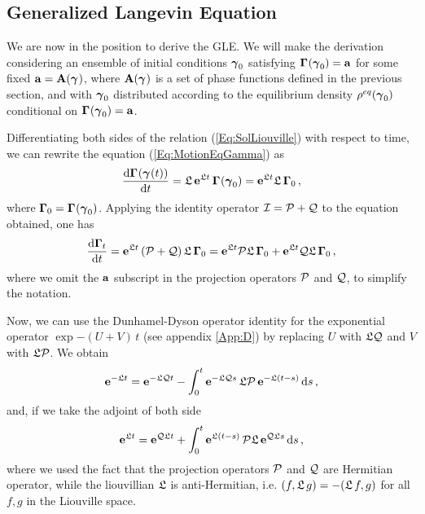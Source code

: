 \documentclass[10pt,a4paper]{book}
\theoremstyle{definition}
\begin{document}
\subsection{Generalized Langevin Equation}
We are now in the position to derive the GLE. We will make the derivation considering an ensemble of initial conditions $\boldsymbol\gamma_{0}$ satisfying $\boldsymbol\Gamma_{}(\boldsymbol\gamma_{0})=\mathbf{a}$ for some fixed $\mathbf{a}=\mathbf{A}(\boldsymbol\gamma_{})$, where $\mathbf{A}(\boldsymbol\gamma_{})$ is a set of phase functions defined in the previous section, and with $\boldsymbol\gamma_{0}$ distributed according to the equilibrium density $\rho^{eq}(\boldsymbol\gamma_{0})$ conditional on $\boldsymbol\Gamma_{}(\boldsymbol\gamma_{0})=\mathbf{a}$.  

Differentiating both sides of the relation (\ref{Eq:SolLiouville}) with respect to time, we can rewrite the equation (\ref{Eq:MotionEqGamma}) as
\begin{equation}
 \frac{\mbox{d}\boldsymbol\Gamma_{}(\boldsymbol\gamma_{}(t))}{\mbox{d}t} = \mathfrak{L}\,\mathbf{e}^{\mathfrak{L} t}\,\boldsymbol\Gamma_{}(\boldsymbol\gamma_{0}) = \mathbf{e}^{\mathfrak{L} t}\mathfrak{L}\,\boldsymbol\Gamma_{0}\,, 
\end{equation}
where $\boldsymbol\Gamma_{0}=\boldsymbol\Gamma_{}(\boldsymbol\gamma_{0})$. Applying the identity operator $\mathcal{I}=\mathcal{P}+\mathcal{Q}$ to the equation obtained, one has
\begin{equation}\label{Eq:MoIdProj}
 \frac{\mbox{d}\boldsymbol\Gamma_{t}}{\mbox{d}t} = \mathbf{e}^{\mathfrak{L} t}\left(\mathcal{P}+\mathcal{Q}\right)\mathfrak{L}\,\boldsymbol\Gamma_{0}=
 \mathbf{e}^{\mathfrak{L} t}\mathcal{P}\mathfrak{L}\,\boldsymbol\Gamma_{0} + \mathbf{e}^{\mathfrak{L} t}\mathcal{Q}\mathfrak{L}\,\boldsymbol\Gamma_{0}\,, 
\end{equation}
where we omit the $\mathbf{a}$ subscript in the projection operators $\mathcal{P}$ and $\mathcal{Q}$, to simplify the notation.

Now, we can use the  Dunhamel-Dyson operator identity for the exponential operator $\exp{-(U+V)\,t}$ (see appendix \ref{App:D}) by replacing $U$ with $\mathfrak{L}\mathcal{Q}$ and $V$ with $\mathfrak{L}\mathcal{P}$. We obtain
$$
\mathbf{e}^{-\mathfrak{L} t} = \mathbf{e}^{-\mathfrak{L}\mathcal{Q} t}-\int_0^{t}\mathbf{e}^{-\mathfrak{L}\mathcal{Q} s}\,\mathfrak{L}\mathcal{P} \,\mathbf{e}^{-\mathfrak{L}(t-s)}\,\mbox{d} s\,,
$$
and, if we take the adjoint of both side
\begin{equation}
 \mathbf{e}^{\mathfrak{L} t} = \mathbf{e}^{\mathcal{Q}\mathfrak{L} t} + \int_0^t \mathbf{e}^{\mathfrak{L} (t-s)}\,\mathcal{P}\mathfrak{L}\,\mathbf{e}^{\mathcal{Q}\mathfrak{L} s}\,\mbox{d} s\,,
\end{equation}
where we used the fact that the projection operators $\mathcal{P}$ and $\mathcal{Q}$ are Hermitian operator, while the liouvillian $\mathfrak{L}$ is anti-Hermitian, i.e. $(f,\mathfrak{L}\, g)=-(\mathfrak{L}\, f,g)$ for all $f,g$ in the Liouville space.
\end{document}
